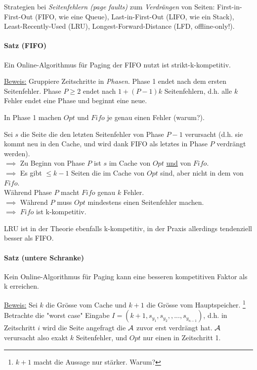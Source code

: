 Strategien bei \emph{Seitenfehlern (page faults)} zum \emph{Verdrängen} von Seiten:
First-in-First-Out (FIFO, wie eine Queue),
Last-in-First-Out (LIFO, wie ein Stack),
Least-Recently-Used (LRU),
Longest-Forward-Distance (LFD, offline-only!).

\paragraph{Satz (FIFO)}
Ein Online-Algorithmus für Paging der FIFO nutzt ist strikt-k-kompetitiv.

\underline{Beweis:}
Gruppiere Zeitschritte in \emph{Phasen}.
Phase 1 endet nach dem ersten Seitenfehler.
Phase $P \geq 2$ endet nach $1+ (P-1)k$ Seitenfehlern, d.h. alle $k$ Fehler endet eine Phase und beginnt eine neue.

In Phase 1 machen $Opt$ und $Fifo$ je genau einen Fehler (warum?).

Sei $s$ die Seite die den letzten Seitenfehler von Phase $P-1$ verursacht
(d.h. sie kommt neu in den Cache, und wird dank FIFO als letztes in Phase $P$ verdrängt werden). \\
$\implies$ Zu Beginn von Phase $P$ ist $s$ im Cache von $Opt$ \underline{und} von $Fifo$. \\
$\implies$ Es gibt $\leq k-1$ Seiten die im Cache von $Opt$ sind, aber nicht in dem von $Fifo$. \\
Während Phase $P$ macht $Fifo$ genau $k$ Fehler. \\
$\implies$  Während $P$ muss $Opt$ mindestens einen Seitenfehler machen. \\
$\implies$  $Fifo$ ist k-kompetitiv.

LRU ist in der Theorie ebenfalls k-kompetitiv, in der Praxis allerdings tendenziell besser als FIFO.

\paragraph{Satz (untere Schranke)}
Kein Online-Algorithmus für Paging kann eine besseren kompetitiven Faktor als k erreichen.

\underline{Beweis:}
Sei $k$ die Grösse vom Cache und $k+1$ die Grösse vom Hauptspeicher.
\footnote{$k+1$ macht die Aussage nur stärker. Warum?}
Betrachte die "worst case" Eingabe $ I = (k+1, s_{y_1}, s_{y_2},, ..., s_{y_{n-1}}) $,
d.h. in Zeitschritt $i$ wird die Seite angefragt die $\mathcal{A}$ zuvor erst verdrängt hat.
$\mathcal{A}$ verursacht also exakt $k$ Seitenfehler, und $Opt$ nur einen in Zeitschritt 1.

